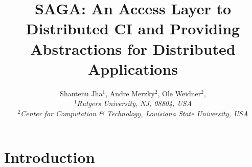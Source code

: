 \documentclass[a4paper,12pt]{article}
\newif\ifdraft
\begin{document}
\title{ \large \vspace{-3.5em} SAGA: An Access Layer to Distributed CI
  and Providing Abstractions for Distributed Applications}


\author{\normalsize Shantenu Jha$^{1}$, Andre Merzky$^{2}$, Ole
  Weidner$^{2}$, \\ \small{\emph{$^{1}$Rutgers University, NJ, 08804,
      USA}}\\ \small{\emph{$^{2}$Center for Computation \& Technology,
      Louisiana State University, USA}}\\ } \date{}
 \maketitle

\ifdraft
 \tableofcontents
\fi

 
% 
\section{Introduction}
 \label{intro}




\end{document}
